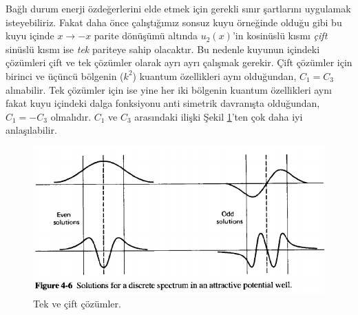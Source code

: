 \documentclass[a4paper,12pt, twoside]{article}
\begin{document}
Bağlı durum enerji özdeğerlerini elde etmek için gerekli sınır şartlarını uygulamak isteyebiliriz. Fakat daha önce çalıştığımız sonsuz kuyu örneğinde olduğu gibi bu kuyu içinde $x\rightarrow-x$ parite dönüşümü altında $u_2(x)$'in kosinüslü kısmı \emph{çift} sinüslü kısmı ise \emph{tek} pariteye sahip olacaktır. Bu nedenle kuyunun içindeki çözümleri çift ve tek çözümler olarak ayrı ayrı çalışmak gerekir. Çift çözümler için birinci ve üçüncü bölgenin ($k^2$) kuantum özellikleri aynı olduğundan, $C_1 = C_3$ alınabilir. Tek çözümler için ise yine  her iki bölgenin kuantum özellikleri aynı fakat kuyu içindeki dalga fonksiyonu anti simetrik davranışta olduğundan, $C_1 = -C_3$ olmalıdır. $C_1$ ve $C_3$ arasındaki ilişki Şekil \ref{fig:sonlukuyu_tekcift}'ten çok daha iyi anlaşılabilir.
\begin{figure}[!hbtp]
	\centering
	\includegraphics[width=.7\linewidth]{figurler/SonluKuyu_tek_cift_bagliDurumlar.png}
	\caption{Tek ve çift çözümler.}
	\label{fig:sonlukuyu_tekcift}
\end{figure}
\end{document}
